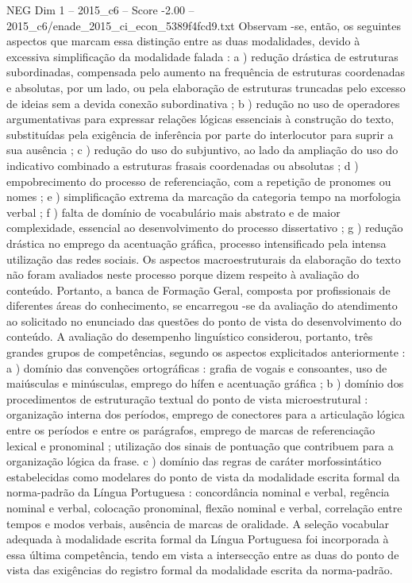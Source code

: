 \begin{textsample}{NEG Dim 1 – 2015\_c6 – Score -2.00 – 2015\_c6/enade\_2015\_ci\_econ\_5389f4fcd9.txt}
Observam -se, então, os seguintes aspectos que marcam essa distinção entre as duas modalidades, devido à excessiva simplificação da modalidade falada : a ) redução drástica de estruturas subordinadas, compensada pelo aumento na frequência de estruturas coordenadas e absolutas, por um lado, ou pela elaboração de estruturas truncadas pelo excesso de ideias sem a devida conexão subordinativa ; b ) redução no uso de operadores argumentativas para expressar relações lógicas essenciais à construção do texto, substituídas pela exigência de inferência por parte do interlocutor para suprir a sua ausência ; c ) redução do uso do subjuntivo, ao lado da ampliação do uso do indicativo combinado a estruturas frasais coordenadas ou absolutas ; d ) empobrecimento do processo de referenciação, com a repetição de pronomes ou nomes ; e ) simplificação extrema da marcação da categoria tempo na morfologia verbal ; f ) falta de domínio de vocabulário mais abstrato e de maior complexidade, essencial ao desenvolvimento do processo dissertativo ; g ) redução drástica no emprego da acentuação gráfica, processo intensificado pela intensa utilização das redes sociais.
Os aspectos macroestruturais da elaboração do texto não foram avaliados neste processo porque dizem respeito à avaliação do conteúdo.
Portanto, a banca de Formação Geral, composta por profissionais de diferentes áreas do conhecimento, se encarregou -se da avaliação do atendimento ao solicitado no enunciado das questões do ponto de vista do desenvolvimento do conteúdo.
A avaliação do desempenho linguístico considerou, portanto, três grandes grupos de competências, segundo os aspectos explicitados anteriormente : a ) domínio das convenções ortográficas : grafia de vogais e consoantes, uso de maiúsculas e minúsculas, emprego do hífen e acentuação gráfica ; b ) domínio dos procedimentos de estruturação textual do ponto de vista microestrutural : organização interna dos períodos, emprego de conectores para a articulação lógica entre os períodos e entre os parágrafos, emprego de marcas de referenciação lexical e pronominal ; utilização dos sinais de pontuação que contribuem para a organização lógica da frase. c ) domínio das regras de caráter morfossintático estabelecidas como modelares do ponto de vista da modalidade escrita formal da norma-padrão da Língua Portuguesa : concordância nominal e verbal, regência nominal e verbal, colocação pronominal, flexão nominal e verbal, correlação entre tempos e modos verbais, ausência de marcas de oralidade.
A seleção vocabular adequada à modalidade escrita formal da Língua Portuguesa foi incorporada à essa última competência, tendo em vista a intersecção entre as duas do ponto de vista das exigências do registro formal da modalidade escrita da norma-padrão.

\end{textsample}
